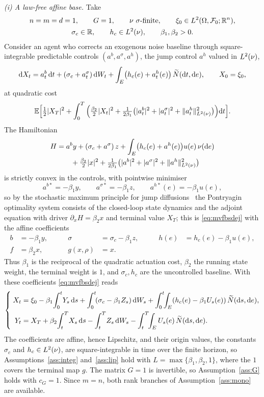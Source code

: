 \begin{example}\label{ex:concrete}\leavevmode\par\nopagebreak
\emph{(i) A law-free affine base.} Take
\[
\begin{gathered}
n=m=d=1,\qquad G=1,\qquad \nu\ \sigma\text{-finite},\qquad
\xi_0\in L^2(\Omega,\mathcal{F}_0;\mathbb{R}^n),\\
\sigma_c\in\mathbb{R},\qquad h_c\in L^2(\nu),\qquad \beta_1,\beta_2>0 .
\end{gathered}
\]
Consider an agent who corrects an exogenous noise baseline through square-integrable
predictable controls $(a^b,a^\sigma,a^h)$, the jump control $a^h$ valued in $L^2(\nu)$,
\[
\mathrm{d} X_t=a^b_t\,\mathrm{d} t+(\sigma_c+a^\sigma_t)\,\mathrm{d} W_t
+\int_E\bigl(h_c(e)+a^h_t(e)\bigr)\,\widetilde{N}(\mathrm{d} t,\mathrm{d} e),\qquad X_0=\xi_0,
\]
at quadratic cost
\[
\mathbb{E}\Big[\tfrac12|X_T|^2+\int_0^T\Big(\tfrac{\beta_2}2|X_t|^2
+\tfrac1{2\beta_1}\bigl(|a^b_t|^2+|a^\sigma_t|^2+\lVert a^h_t\rVert_{L^2(\nu)}^2\bigr)\Big)\mathrm{d} t\Big].
\]
The Hamiltonian
\[
\begin{aligned}
H&=a^b y+(\sigma_c+a^\sigma)\,z+\int_E\bigl(h_c(e)+a^h(e)\bigr)u(e)\,\nu(\mathrm{d} e)\\
&\qquad+\tfrac{\beta_2}2|x|^2+\tfrac1{2\beta_1}\bigl(|a^b|^2+|a^\sigma|^2+\lVert a^h\rVert_{L^2(\nu)}^2\bigr)
\end{aligned}
\]
is strictly convex in the controls, with pointwise minimiser
\[
a^{b*}=-\beta_1 y,\qquad a^{\sigma*}=-\beta_1 z,\qquad a^{h*}(e)=-\beta_1 u(e),
\]
so by the stochastic maximum principle for jump diffusions~\cite{TangLi} the Pontryagin
optimality system consists of the closed-loop state dynamics and the adjoint equation
with driver $\partial_xH=\beta_2x$ and terminal value $X_T$; this is
\eqref{eq:mvfbsdej} with the affine coefficients
\[
\begin{aligned}
b&=-\beta_1 y, &\qquad \sigma&=\sigma_c-\beta_1 z, &\qquad h(e)&=h_c(e)-\beta_1 u(e),\\
f&=\beta_2 x, &\qquad g(x,\rho)&=x .
\end{aligned}
\]
Thus $\beta_1$ is the reciprocal of the quadratic actuation cost, $\beta_2$ the running
state weight, the terminal weight is $1$, and $\sigma_c,h_c$ are the uncontrolled baseline.
With these coefficients \eqref{eq:mvfbsdej} reads
\[
\left\{\;\begin{aligned}
X_t&=\xi_0-\beta_1\!\int_0^t\! Y_s\,\diff s+\int_0^t\!(\sigma_c-\beta_1 Z_s)\,\diff W_s
+\int_0^t\!\!\int_E(h_c(e)-\beta_1 U_s(e))\,\Nt(\diff s,\diff e),\\
Y_t&=X_T+\beta_2\!\int_t^T\! X_s\,\diff s-\int_t^T\! Z_s\,\diff W_s
-\int_t^T\!\!\int_E U_s(e)\,\Nt(\diff s,\diff e).
\end{aligned}\right.
\]
The coefficients are affine, hence Lipschitz, and their origin values, the constants
$\sigma_c$ and $h_c\in L^2(\nu)$, are square-integrable in time over the finite horizon, so
Assumptions~\ref{ass:integ} and~\ref{ass:lip} hold with
$L=\max\{\beta_1,\beta_2,1\}$, where the $1$ covers the terminal map $g$. The matrix $G=1$ is
invertible, so Assumption~\ref{ass:G} holds with $c_G=1$. Since $m=n$,
both rank branches of Assumption~\ref{ass:mono} are available.


\end{example}
